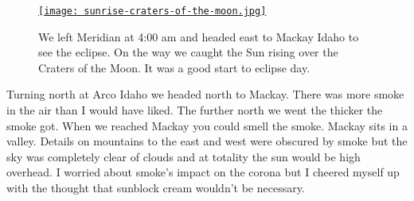 

\begin{SCfigure}
\centering
\href{https://conceptcontrol.smugmug.com/Places/USA-and-Canada/Idaho-Instants/i-mXNChFm/A}{\texttt{[image: sunrise-craters-of-the-moon.jpg]}}
\caption{We left Meridian at 4:00 am and headed east to Mackay Idaho to see the
eclipse. On the way we caught the Sun rising over the Craters of the
Moon. It was a good start to eclipse day.}
\label{fig:5430x1}
\end{SCfigure}


Turning north at Arco Idaho we headed north to Mackay. There was more
smoke in the air than I would have liked. The further north we went the
thicker the smoke got. When we reached Mackay you could smell the smoke.
Mackay sits in a valley. Details on mountains to the east and west were
obscured by smoke but the sky was completely clear of clouds and at
totality the sun would be high overhead. I worried about smoke's impact
on the corona but I cheered myself up with the thought that sunblock
cream wouldn't be necessary.



